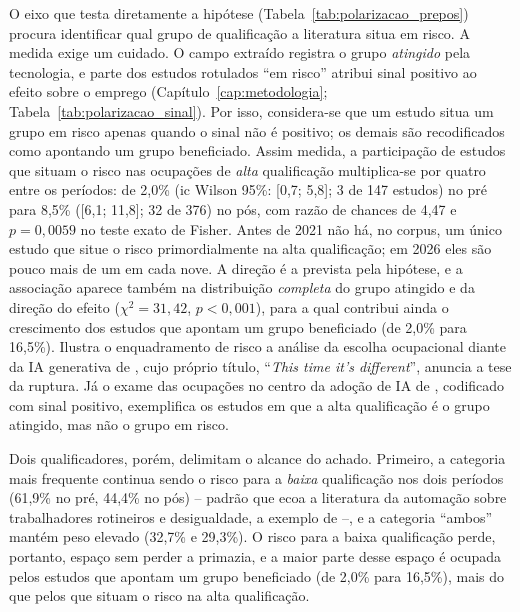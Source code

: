 O eixo que testa diretamente a hipótese (Tabela~\ref{tab:polarizacao_prepos}) procura identificar qual grupo de qualificação a literatura situa em risco. A medida exige um cuidado. O campo extraído registra o grupo \emph{atingido} pela tecnologia, e parte dos estudos rotulados ``em risco'' atribui sinal positivo ao efeito sobre o emprego (Capítulo~\ref{cap:metodologia}; Tabela~\ref{tab:polarizacao_sinal}). Por isso, considera-se que um estudo situa um grupo em risco apenas quando o sinal não é positivo; os demais são recodificados como apontando um grupo beneficiado. Assim medida, a participação de estudos que situam o risco nas ocupações de \emph{alta} qualificação multiplica-se por quatro entre os períodos: de 2,0\% (\gls{ic} Wilson 95\%: [0,7; 5,8]; 3 de 147 estudos) no pré para 8,5\% ([6,1; 11,8]; 32 de 376) no pós, com razão de chances de 4,47 e $p = 0{,}0059$ no teste exato de Fisher. Antes de 2021 não há, no corpus, um único estudo que situe o risco primordialmente na alta qualificação; em 2026 eles são pouco mais de um em cada nove. A direção é a prevista pela hipótese, e a associação aparece também na distribuição \emph{completa} do grupo atingido e da direção do efeito ($\chi^2 = 31{,}42$, $p < 0{,}001$), para a qual contribui ainda o crescimento dos estudos que apontam um grupo beneficiado (de 2,0\% para 16,5\%). Ilustra o enquadramento de risco a análise da escolha ocupacional diante da IA generativa de \textcite{gollerGschwendtWolter2025}, cujo próprio título, ``\textit{This time it's different}'', anuncia a tese da ruptura. Já o exame das ocupações no centro da adoção de IA de \textcite{fontanelli2025}, codificado com sinal positivo, exemplifica os estudos em que a alta qualificação é o grupo atingido, mas não o grupo em risco.

Dois qualificadores, porém, delimitam o alcance do achado. Primeiro, a categoria mais frequente continua sendo o risco para a \emph{baixa} qualificação nos dois períodos (61,9\% no pré, 44,4\% no pós) -- padrão que ecoa a literatura da automação sobre trabalhadores rotineiros e desigualdade, a exemplo de \textcite{mollRachelRestrepo2022} --, e a categoria ``ambos'' mantém peso elevado (32,7\% e 29,3\%). O risco para a baixa qualificação perde, portanto, espaço sem perder a primazia, e a maior parte desse espaço é ocupada pelos estudos que apontam um grupo beneficiado (de 2,0\% para 16,5\%), mais do que pelos que situam o risco na alta qualificação.

